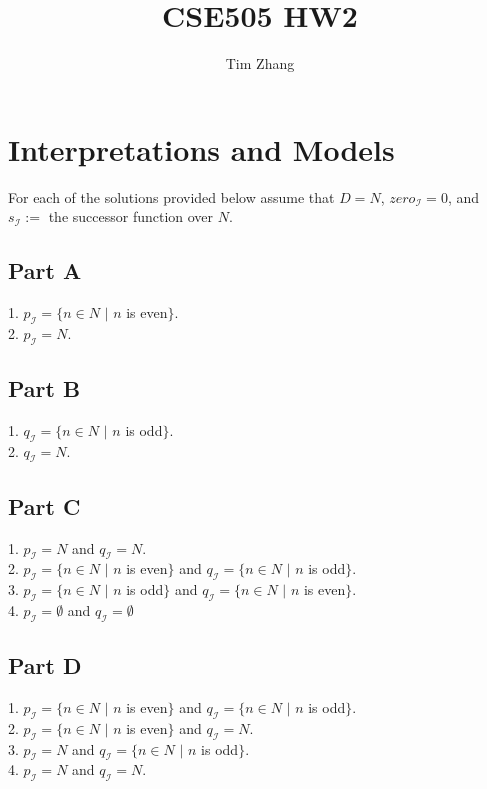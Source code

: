 \documentclass[11pt, oneside]{article}   	%
\title{CSE505 HW2}
\author{Tim Zhang}
\begin{document}
\maketitle

\section{Interpretations and Models}
For each of the solutions provided below assume that $D = N$, $zero_\mathscr{I} = 0$, and $s_\mathscr{I} :=$ the successor function over $N$.
\subsection{Part A}

1. $p_\mathscr{I} = \{n \in N$ $|$ $n$ is even$\}$.\\
2. $p_\mathscr{I} = N$.

\subsection{Part B}

1. $q_\mathscr{I} = \{n \in N$ $|$ $n$ is odd$\}$.\\
2. $q_\mathscr{I} = N$.

\subsection{Part C}
1. $p_\mathscr{I} = N$ and $q_\mathscr{I} = N$.\\
2. $p_\mathscr{I} = \{n \in N$ $|$ $n$ is even$\}$ and $q_\mathscr{I} = \{n \in N$ $|$ $n$ is odd$\}$.\\
3. $p_\mathscr{I} = \{n \in N$ $|$ $n$ is odd$\}$ and $q_\mathscr{I} = \{n \in N$ $|$ $n$ is even$\}$.\\
4. $p_\mathscr{I} = \emptyset$ and $q_\mathscr{I} = \emptyset$

\subsection{Part D}
1. $p_\mathscr{I} = \{n \in N$ $|$ $n$ is even$\}$ and $q_\mathscr{I} = \{n \in N$ $|$ $n$ is odd$\}$.\\
2. $p_\mathscr{I} = \{n \in N$ $|$ $n$ is even$\}$ and $q_\mathscr{I} = N$.\\
3. $p_\mathscr{I} = N$ and $q_\mathscr{I} = \{n \in N$ $|$ $n$ is odd$\}$.\\
4. $p_\mathscr{I} = N$ and $q_\mathscr{I} = N$.
\end{document}
